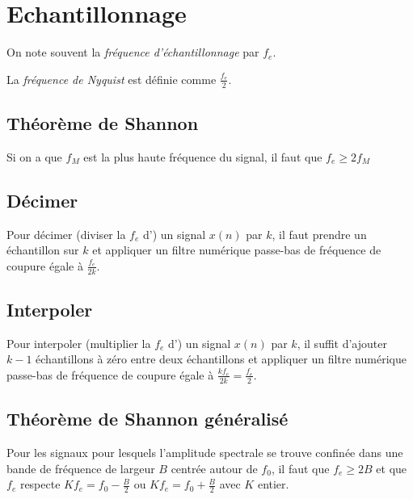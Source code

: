 \section{Echantillonnage}
    On note souvent la \textit{fréquence d'échantillonnage} par $f_e$.

    La \textit{fréquence de Nyquist} est définie comme $\frac{f_e}{2}$.

    \subsection{Théorème de Shannon}
        Si on a que $f_M$ est la plus haute fréquence du signal, il faut que $f_e \geq 2 f_M$

    \subsection{Décimer}
        Pour décimer (diviser la $f_e$ d') un signal $x(n)$ par $k$, il faut prendre un échantillon sur $k$ et appliquer un filtre numérique passe-bas de fréquence de coupure égale à $\frac{f_e}{2k}$.

    \subsection{Interpoler}
        Pour interpoler (multiplier la $f_e$ d') un signal $x(n)$ par $k$, il suffit d'ajouter $k-1$ échantillons à zéro entre deux échantillons et appliquer un filtre numérique passe-bas de fréquence de coupure égale à $\frac{kf_e}{2k} = \frac{f_e}{2}$.

    \subsection{Théorème de Shannon généralisé}
        Pour les signaux pour lesquels l'amplitude spectrale se trouve confinée dans une bande de fréquence de largeur $B$ centrée autour de $f_0$, il faut que $f_e \geq 2B$ et que $f_e$ respecte $Kf_e = f_0 - \frac{B}{2}$ ou $Kf_e = f_0 + \frac{B}{2}$ avec $K$ entier.